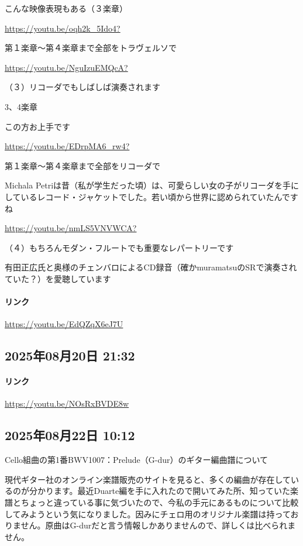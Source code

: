 こんな映像表現もある（３楽章）

\url{https://youtu.be/oqh2k_5Ido4?}

第１楽章〜第４楽章まで全部をトラヴェルソで

\url{https://youtu.be/NguIzuEMQcA?}

（３）リコーダでもしばしば演奏されます

3、4楽章

この方お上手です

\url{https://youtu.be/EDrpMA6_rw4?}

第１楽章〜第４楽章まで全部をリコーダで

Michala Petriは昔（私が学生だった頃）は、可愛らしい女の子がリコーダを手にしているレコード・ジャケットでした。若い頃から世界に認められていたんですね

\url{https://youtu.be/nmLS5VNVWCA?}

（４）もちろんモダン・フルートでも重要なレパートリーです

有田正広氏と奥様のチェンバロによるCD録音（確かmuramatsuのSRで演奏されていた？）を愛聴しています

\paragraph{リンク}
\url{https://youtu.be/EdQZqX6eJ7U}

\subsection*{2025年08月20日 21:32}

\paragraph{リンク}
\url{https://youtu.be/NOsRxBVDE8w}

\subsection*{2025年08月22日 10:12}

Cello組曲の第1番BWV1007：Prelude（G-dur）のギター編曲譜について

現代ギター社のオンライン楽譜販売のサイトを見ると、多くの編曲が存在しているのが分かります。最近Duarte編を手に入れたので開いてみた所、知っていた楽譜とちょっと違っている事に気づいたので、今私の手元にあるものについて比較してみようという気になりました。因みにチェロ用のオリジナル楽譜は持っておりません。原曲はG-durだと言う情報しかありませんので、詳しくは比べられません。


